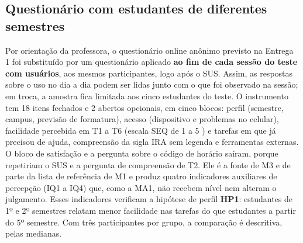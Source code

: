 \subsection{Questionário com estudantes de diferentes semestres}
\label{sec:questionario}

Por orientação da professora, o questionário online anônimo previsto na Entrega 1 foi substituído por um questionário aplicado \textbf{ao fim de cada sessão do teste com usuários}, aos mesmos participantes, logo após o SUS. Assim, as respostas sobre o uso no dia a dia podem ser lidas junto com o que foi observado na sessão; em troca, a amostra fica limitada aos cinco estudantes do teste. O instrumento tem 18 itens fechados e 2 abertos opcionais, em cinco blocos: perfil (semestre, campus, previsão de formatura), acesso (dispositivo e problemas no celular), facilidade percebida em T1 a T6 (escala SEQ de 1 a 5 \cite{sauro2016}) e tarefas em que já precisou de ajuda, compreensão da sigla IRA sem legenda e ferramentas externas. O bloco de satisfação e a pergunta sobre o código de horário saíram, porque repetiriam o SUS e a pergunta de compreensão de T2. Ele é a fonte de M3 e de parte da lista de referência de M1 e produz quatro indicadores auxiliares de percepção (IQ1 a IQ4) que, como a MA1, não recebem nível nem alteram o julgamento. Esses indicadores verificam a hipótese de perfil \textbf{HP1}: estudantes de 1º e 2º semestres relatam menor facilidade nas tarefas do que estudantes a partir do 5º semestre. Com três participantes por grupo, a comparação é descritiva, pelas medianas.
